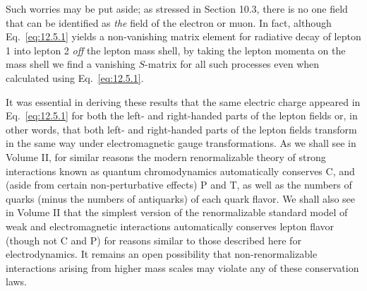 Such worries may be put aside; as stressed in Section 10.3, there is no one
field that can be identified as \emph{the} field of the electron or muon. In
fact, although Eq.~\eqref{eq:12.5.1} yields a non-vanishing matrix element for
radiative decay of lepton 1 into lepton 2 \emph{off} the lepton mass shell, by
taking the lepton momenta on the mass shell we find a vanishing $S$-matrix for
all such processes even when calculated using Eq.~\eqref{eq:12.5.1}.

It was essential in deriving these results that the same electric charge
appeared in Eq.~\eqref{eq:12.5.1} for both the left- and right-handed parts of
the lepton fields or, in other words, that both left- and right-handed parts of
the lepton fields transform in the same way under electromagnetic gauge
transformations. As we shall see in Volume II, for similar reasons the modern
renormalizable theory of strong interactions known as quantum chromodynamics
automatically conserves C, and (aside from certain non-perturbative effects) P
and T, as well as the numbers of quarks (minus the numbers of antiquarks) of
each quark flavor. We shall also see in Volume II that the simplest version of
the renormalizable standard model of weak and electromagnetic interactions
automatically conserves lepton flavor (though not C and P) for reasons similar
to those described here for electrodynamics. It remains an open possibility
that non-renormalizable interactions arising from higher mass scales may
violate any of these conservation laws.

